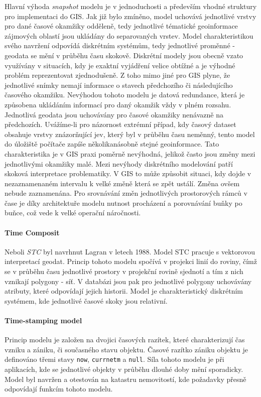 \documentclass[a4paper,12pt,oneside]{report}
\begin{document}
Hlavní výhoda  \textit{snapshot} modelu je v jednoduchosti a především vhodné struktury pro implementaci do GIS. Jak již bylo zmíněno, model uchovává jednotlivé vrstvy pro dané časové okamžiky odděleně, tedy jednotlivé tématické geoinformace zájmových oblastí jsou ukládány do separovaných vrstev.  Model  charakteristikou svého navržení odpovídá diskrétním systémům, tedy jednotlivé proměnné - geodata se mění v průběhu času skokově. Diskrétní modely jsou obecně vzato využívány v situacích, kdy je exaktní vyjádření velice obtížné a je výhodné problém reprezentovat zjednodušeně. Z toho mimo jiné pro GIS plyne, že jednotlivé snímky nemají informace o stavech  předchozího či následujícího časového okamžiku.
Nevýhodou tohoto modelu je datová redundance, která je způsobena ukládáním informací pro daný okamžik vždy v plném rozsahu.  Jednotlivá geodata jsou uchovávány pro časové okamžiky nenávazně na předchozích. Uvážíme-li pro názornost extrémní případ, kdy časový dataset obsahuje vrstvy znázorňující jev, který byl v průběhu času neměnný, tento model do úložiště počítače zapíše několikanásobně stejné geoinformace. Tato charakteristika je v GIS praxi poměrně nevýhodná, jelikož často jsou změny mezi jednotlivými okamžiky malé.
Mezi nevýhody diskrétního modelování patří skoková interpretace problematiky. V GIS to může způsobit situaci, kdy dojde v nezaznamenaném intervalu k velké změně která se zpět ustálí. Změna ovšem nebude zaznamenána.
Pro srovnávání změn jednotlivých prostorových rámců v čase je díky architektuře modelu nutnost procházení a porovnávání buňky po buňce, což vede k velké operační náročnosti.

\paragraph*{Time Composit}
Neboli \textit{\ac{STC}} byl navrhnut Lagran\cite{lagran} v letech 1988. Model \acs{STC} pracuje s vektorovou interpretací geodat.   Princip tohoto modelu spočívá v projekci linií do roviny, čímž se v průběhu času jednotlivé prostory v projekční rovině sjednotí a tím z nich vznikají polygony - síť. V databázi jsou pak pro jednotlivé polygony uchovávány atributy, které odpovídají jejich historii.
Model je charakteristický diskrétním systémem, kde jednotlivé časové skoky jsou relativní.

\paragraph*{Time-stamping model} 
Princip modelu je založen na dvojici časových razítek, které charakterizují čas vzniku a zániku, či současného stavu objektu. Časové razítko zániku objektu je definováno třemi stavy \texttt{now}, \texttt{currnetm}  a \texttt{null}. 
Síla tohoto modelu je při aplikacích, kde se jednotlivé objekty v průběhu dlouhé doby mění sporadicky. Model byl navržen a otestován na katastru nemovitostí, kde požadavky přesně odpovídají funkcím tohoto modelu.\cite{hunter}
\end{document}
